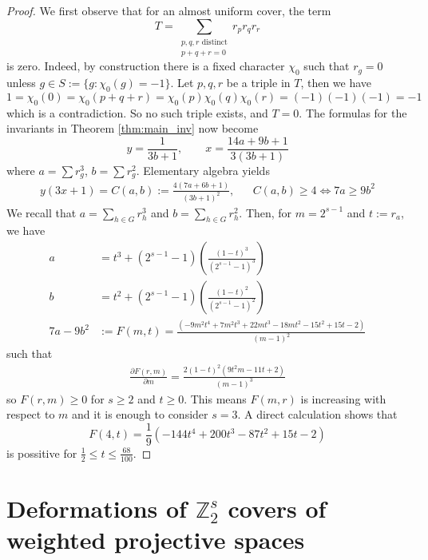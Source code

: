 \documentclass[12pt,twoside,]{amsart}
\theoremstyle{plain}
\theoremstyle{definition}
\begin{document}
\begin{proof}
We first observe that for an almost uniform cover, the term 
$$
T = \sum_{\substack{p,q,r \text{ distinct} \\ p+q+r=0}} r_p r_q r_r
$$
is zero. Indeed, by construction there is a fixed character $\chi_0$ such that $r_g = 0$ unless $g \in S := \{g : \chi_0(g) = -1\}$. 
Let $p,q,r$ be a triple in $T$, then we have  
$$
1 = \chi_0(0) = \chi_0(p+q+r) = \chi_0(p)\chi_0(q)\chi_0(r) = (-1)(-1)(-1) = -1
$$
which is a contradiction. So no such triple exists, and $T = 0$. The formulas for the invariants in Theorem \ref{thm:main_inv} now become
\[
y = \frac{1}{3b + 1}, \qquad x = \frac{14a + 9b + 1}{3(3b+1)}
\]
where $a = \sum r_g^3$, $b = \sum r_g^2$. Elementary algebra yields
\begin{align*}
y(3x+1) = C(a,b):=\frac{4(7a + 6b + 1)}{(3b+1)^2}, 
&&
C(a, b) \geq 4 \iff 7a \geq 9b^2
\end{align*}
We recall that $a=\sum_{h \in G} r_h^3$ 
and 
$b=\sum_{h \in G} r_h^2$. 
Then, for $m= 2^{s-1}$ and $t := r_a$, we have
\begin{align*}
 a &= t^3 + (2^{s-1}-1) \left( \frac{(1-t)^3}{(2^{s-1}-1)^3} \right) 
 \\
 b &= t^2 + (2^{s-1}-1) \left( \frac{(1-t)^2}{(2^{s-1}-1)^2}  \right)
 \\
 7a-9b^2 &:= F(m,t) = 
 \frac{(-9 m^2 t^4 + 7 m^2 t^3 + 22 m t^3 - 18 m t^2 - 15 t^2 + 15 t - 2)}{(m - 1)^2}
\end{align*}
such that 
\begin{align*}
\frac{\partial F(r,m)}{\partial m}
= \frac{2 (1 - t)^2 (9 t^2 m - 11 t + 2)}{(m - 1)^3}
\end{align*}
so $F(r,m) \geq 0$ for $s \geq 2$ and $t \geq 0$. This means $F(m,r)$ is increasing with respect to $m$ and it is enough to consider $s=3$. A direct calculation shows that 
$$
F(4,t) = \frac{1}{9} (-144 t^4 + 200 t^3 - 87 t^2 + 15 t - 2)
$$ is possitive for $\frac{1}{2} \leq t \leq \frac{68}{100}$.
\end{proof}



\section{Deformations of $\mathbb{Z}_2^s$ covers of weighted projective spaces}
\label{sec:deformation_theory}
\end{document}
